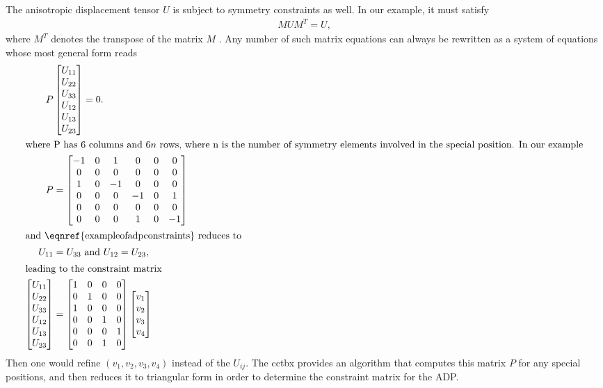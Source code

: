 \documentclass[pdf]{iucr}
\begin{document}
The anisotropic displacement tensor $U$ is subject to symmetry constraints as well. In our example, it must satisfy
\begin{align}
M U M^T = U,
\end{align}
where $M^T$ denotes the transpose of the matrix $M$ \textbookref. Any number of such matrix equations can always be rewritten as a system of equations whose most general form reads
\begin{align}
P &\begin{bmatrix}
U_{11}\\
U_{22}\\
U_{33}\\
U_{12}\\
U_{13}\\
U_{23}\\
\end{bmatrix} = 0.\label{eqn:exampleofadpconstraints}\\
\intertext{where P has 6 columns and $6n$ rows, where n is the number of symmetry elements involved in the special position. In our example} P &= \begin{bmatrix}
-1 & 0 & 1 & 0 & 0 & 0\\
0 & 0 & 0 & 0 & 0 & 0\\
1 & 0 & -1 & 0 & 0 & 0\\
0 & 0 & 0 & -1 & 0 & 1\\
0 & 0 & 0 & 0 & 0 & 0\\
0 & 0 & 0 & 1 & 0 & -1
\end{bmatrix}\\
\intertext{and \eqnref{exampleofadpconstraints} reduces to}
U_{11} &= U_{33}\text{ and } U_{12} = U_{23},\\
\intertext{leading to the constraint matrix}
\begin{bmatrix}
U_{11}\\
U_{22}\\
U_{33}\\
U_{12}\\
U_{13}\\
U_{23}\\
\end{bmatrix} &= \begin{bmatrix}
1 & 0 & 0 & 0\\
0 & 1 & 0 & 0\\
1 & 0 & 0 & 0\\
0 & 0 & 1 & 0\\
0 & 0 & 0 & 1\\
0 & 0 & 1 & 0
\end{bmatrix} \begin{bmatrix}
v_1\\
v_2\\
v_3\\
v_4
\end{bmatrix}
\end{align} 
Then one would refine $(v_1, v_2, v_3, v_4)$ instead of the $U_{ij}$.
The cctbx provides an algorithm that computes this matrix $P$ for any special positions, and then reduces it to triangular form in order to determine the constraint matrix for the ADP.
\end{document}
